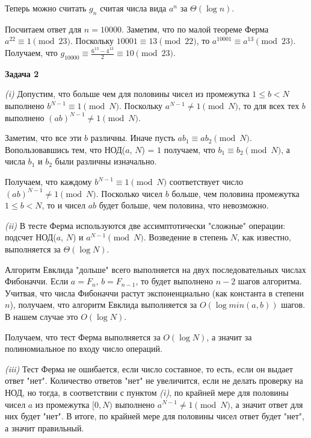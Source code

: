 \documentclass[10pt]{article}
\begin{document}
Теперь можно считать $g_n$ считая числа вида $a^n$ за $\Theta(\log{n})$.

Посчитаем ответ для $n = 10000$.
Заметим, что по малой теореме Ферма $a^{22} \equiv 1 \pmod{23}$.
Поскольку $10001 \equiv 13 \pmod{22}$, то $a^{10001} \equiv a^{13} \pmod{23}$.
Получаем, что $g_{10000} \equiv \frac{6^{13} - 4^{13}}{2} \equiv 10 \pmod {23}$.  

\medskip

{\bf Задача 2}

{\it (i)}
Допустим, что больше чем для половины чисел из промежутка $1 \leq b < N$ выполнено $b^{N - 1} \equiv 1 \pmod{N}$.
Поскольку $a^{N - 1} \neq 1 \pmod{N}$, то для всех тех $b$ выполнено $(a b)^{N - 1} \neq 1 \pmod{N}$.

Заметим, что все эти $b$ различны. Иначе пусть $a b_1 \equiv a b_2 \pmod{N}$.
Вопользовавшись тем, что НОД($a$, $N$) = $1$ получаем, что $b_1 \equiv b_2 \pmod{N}$, а числа $b_1$ и $b_2$ были различны изначально.

Получаем, что каждому $b^{N - 1} \equiv 1 \pmod{N}$ соответствует число $(a b)^{N - 1} \neq 1 \pmod{N}$. Посколько чисел $b$ больше, чем половина промежутка $1 \leq b < N$, то и чисел $a b$ будет больше, чем половина, что невозможно.

\smallskip

{\it (ii)}
В тесте Ферма используются две ассимптотически "сложные" операции: подсчет НОД($a$, $N$) и $a^{N - 1} \pmod{N}$.
Возведение в степень $N$, как известно, выполняется за $\Theta(\log{N})$.

Алгоритм Евклида "дольше" всего выполняется на двух последовательных числах Фибоначчи.
Если $a = F_n$, $b = F_{n - 1}$, то будет выполнено $n - 2$ шагов алгоритма.
Учитвая, что числа Фибоначчи растут экспоненциально (как константа в степени $n$), получаем, что алгоритм Евклида выполняется за $O(\log{min(a, b)})$ шагов.
В нашем случае это $O(\log{N})$.

Получаем, что тест Ферма выполняется за $O(\log{N})$, а значит за полиномиальное по входу число операций.

\smallskip

{\it (iii)}
Тест Ферма не ошибается, если число составное, то есть, если он выдает ответ "нет".
Количество ответов "нет" не увеличится, если не делать проверку на НОД, но тогда, в соответствии с пунктом {\it (i)}, по крайней мере для половины чисел $a$ из промежутка $[0, N)$ выполнено $a^{N - 1} \neq 1 \pmod{N}$, а значит ответ для них будет "нет".
В итоге, по крайней мере для половины чисел ответ будет "нет", а значит правильный.
\end{document}
